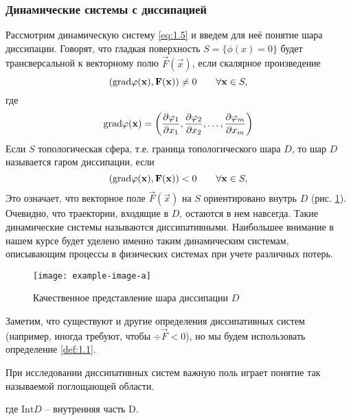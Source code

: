 \subsubsection{Динамические системы с диссипацией} %
Рассмотрим динамическую систему \eqref{eq:1.5}  и введем для неё понятие шара диссипации. Говорят, что гладкая поверхность $S=\{\phi(x) = 0 \}$ будет трансверсальной к векторному полю $\vec F (\vec x) $, если скалярное произведение
\begin{equation}
	\qty(\textrm{grad} \varphi(\mathbf x), \mathbf F(\mathbf x)) \neq 0 \qquad \forall \mathbf x \in S,
\end{equation}
где 
\begin{equation}
	\textrm{grad} \varphi(\mathbf x) = \qty(\pdv{\varphi_1}{x_1},\pdv{\varphi_2}{x_2},\dots, \pdv{\varphi_m}{x_m})
\end{equation}
Если $S$ топологическая сфера, т.е. граница топологического шара $D$, то шар $D$ называется гаром диссипации, если
\begin{equation}
	\qty(\textrm{grad} \varphi(\mathbf x), \mathbf F(\mathbf x)) < 0 \qquad \forall \mathbf x \in S,
\end{equation}
Это означает, что векторное поле $\vec F(\vec x)$ на $S$ ориентировано внутрь $D$ (рис. \ref{fig:fig2}). Очевидно, что траектории, входящие в $D$, остаются в нем навсегда. Такие динамические системы называются диссипативными. Наибольшее внимание в нашем курсе будет уделено именно таким динамическим системам, описывающим процессы в физических системах при учете различных потерь. 

\begin{figure}[h!]
	\centering
	\texttt{[image: example-image-a]}
	\caption{Качественное представление шара диссипации $D$}
	\label{fig:fig2}
\end{figure}



Заметим, что существуют и другие определения диссипативных систем (например, иногда требуют, чтобы $\div \vec F < 0$), но мы будем использовать определение \ref{def:1.1}. 

При исследовании диссипативных систем важную поль играет понятие так называемой поглощающей области.

где $\mathrm{Int} D$ -- внутренняя часть D.

